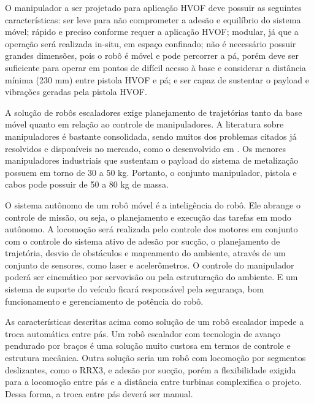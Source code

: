 O manipulador a ser projetado para aplicação HVOF deve possuir as seguintes
características: ser leve para não comprometer a adesão e equilíbrio do sistema
móvel; rápido e preciso conforme requer a aplicação HVOF; modular, já
que a operação será realizada in-situ, em espaço confinado;
não é necessário possuir grandes dimensões, pois o robô é móvel e pode
percorrer a pá, porém deve ser suficiente para operar em pontos de
difícil acesso à base e considerar a distância mínima (230 mm) entre pistola
HVOF e pá; e ser capaz de sustentar o payload e vibrações geradas pela
pistola HVOF. 

A solução de robôs escaladores exige planejamento de trajetórias tanto da base
móvel quanto em relação ao controle de manipuladores. A literatura sobre
manipuladores é bastante consolidada, sendo muitos dos problemas citados já
resolvidos e disponíveis no mercado, como o desenvolvido em
\cite{manzdevelopment}. Os menores manipuladores industriais que sustentam o
payload do sistema de metalização possuem em torno de 30 a 50 kg. Portanto, o conjunto
manipulador, pistola e cabos pode possuir de 50 a 80 kg de massa.


O sistema autônomo de um robô móvel é a inteligência do robô. Ele abrange o
controle de missão, ou seja, o planejamento e execução das tarefas em modo
autônomo. A locomoção será realizada pelo controle dos motores em conjunto com o
controle do sistema ativo de adesão por sucção, o planejamento de trajetória, desvio de
obstáculos e mapeamento do ambiente, através de um conjunto de sensores, como
laser e acelerômetros. O controle do manipulador poderá ser cinemático por
servovisão ou pela estruturação do ambiente. E um sistema de suporte do veículo
ficará responsável pela segurança, bom funcionamento e gerenciamento de potência
do robô.

As características descritas acima como solução de um robô escalador impede a
troca automática entre pás. Um robô escalador com tecnologia de avanço pendurado
por braços é uma solução muito custosa em termos de controle e estrutura
mecânica. Outra solução seria um robô com locomoção por segmentos deslizantes,
como o RRX3, e adesão por sucção, porém a flexibilidade exigida para a locomoção
entre pás e a distância entre turbinas complexifica o projeto. Dessa forma, a
troca entre pás deverá ser manual.

